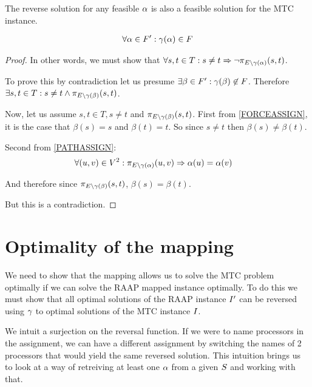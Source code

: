 \begin{lemma}
\label{REVERSEFEASABLE}
The reverse solution for any feasible $\alpha$ is also a feasible solution for the MTC instance.

\begin{align}
	\nonumber \forall \alpha \in F' : \gamma(\alpha) \in F
\end{align}
\end{lemma}
\begin{proof}
In other words, we must show that $\forall s, t \in T : s \neq t \Rightarrow \neg\pi_{E \setminus \gamma(\alpha)}(s, t)$.

To prove this by contradiction let us presume $\exists \beta \in F' : \gamma(\beta) \not\in F$.
Therefore $\exists s, t \in T : s \neq t \wedge \pi_{E \setminus \gamma(\beta)}(s, t)$.

Now, let us assume $s, t \in T, s \neq t$ and $\pi_{E \setminus \gamma(\beta)}(s, t)$.
First from \ref{FORCEASSIGN}, it is the case that $\beta(s) = s$ and $\beta(t) = t$.
So since $s \neq t$ then $\beta(s) \neq \beta(t)$.

Second from \ref{PATHASSIGN}:
\begin{align}
	\nonumber \forall (u, v) \in V^2 : \pi_{E \setminus \gamma(\alpha)}(u, v) & \Rightarrow \alpha(u) = \alpha(v)
\end{align}

And therefore since $\pi_{E \setminus \gamma(\beta)}(s, t)$, $\beta(s) = \beta(t)$.

But this is a contradiction.
\end{proof}

\section{Optimality of the mapping}
\label{secHardOpt}

We need to show that the mapping allows us to solve the MTC problem optimally if we can solve the RAAP mapped instance optimally.
To do this we must show that all optimal solutions of the RAAP instance $I'$ can be reversed using $\gamma$ to optimal solutions of the MTC instance $I$.

We intuit a surjection on the reversal function.
If we were to name processors in the assignment, we can have a different assignment by switching the names of 2 processors that would yield the same reversed solution.
This intuition brings us to look at a way of retreiving at least one $\alpha$ from a given $S$ and working with that.

